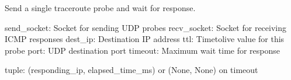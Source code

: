 \documentclass[letterpaper,10pt,english]{sphinxmanual}
\begin{document}
\begin{fulllineitems}
\label{\detokenize{my_traceroute:my_traceroute.send_probe}}
\pysigstartsignatures
\pysiglinewithargsret
{}
{\sphinxparamcomma {}\sphinxparamcomma {}\sphinxparamcomma {}\sphinxparamcomma {}\sphinxparamcomma {}}
{}
\pysigstopsignatures
\sphinxAtStartPar
Send a single traceroute probe and wait for response.
\begin{description}
\sphinxAtStartPar
send\_socket: Socket for sending UDP probes
recv\_socket: Socket for receiving ICMP responses
dest\_ip: Destination IP address
ttl: Time\sphinxhyphen{}to\sphinxhyphen{}live value for this probe
port: UDP destination port
timeout: Maximum wait time for response

\sphinxAtStartPar
tuple: (responding\_ip, elapsed\_time\_ms) or (None, None) on timeout

\end{description}

\end{fulllineitems}



\renewcommand{\indexname}{Python Module Index}
\begin{sphinxtheindex}
\let\bigletter\sphinxstyleindexlettergroup
\bigletter{m}
\item\relax{}
\item\relax{}
\end{sphinxtheindex}

\renewcommand{\indexname}{Index}
\printindex
\end{document}
